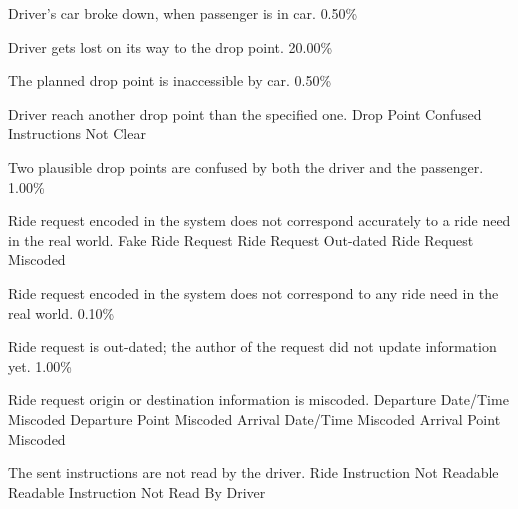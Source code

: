   \startkaosspec
  	 {Driver’s car broke down, when passenger is in car.}
  	 {0.50\%}
  \stopkaosspec
  
  \startkaosspec
  	 {Driver gets lost on its way to the drop point.}
  	 {20.00\%}
  \stopkaosspec
  
  \startkaosspec
  	 {The planned drop point is inaccessible by car.}
  	 {0.50\%}
  \stopkaosspec
  
  \startkaosspec
  	 {Driver reach another drop point than the specified one.}
  	 {Drop Point Confused}
  	 {Instructions Not Clear}
  \stopkaosspec
  
  \startkaosspec
  	 {Two plausible drop points are confused by both the driver and the passenger.}
  	 {1.00\%}
  \stopkaosspec
  

    {}

  \startkaosspec
  	 {Ride request encoded in the system does not correspond accurately to a ride need in the real world.}
  	 {Fake Ride Request}
  	 {Ride Request Out-dated}
  	 {Ride Request Miscoded}
  \stopkaosspec

  \startkaosspec
  	 {Ride request encoded in the system does not correspond to any ride need in the real world.}
  	 {0.10\%}
  \stopkaosspec

  \startkaosspec
  	 {Ride request is out-dated; the author of the request did not update information yet.}
  	 {1.00\%}
  \stopkaosspec

  \startkaosspec
  	 {Ride request origin or destination information is miscoded.}
  	 {Departure Date/Time Miscoded}
  	 {Departure Point Miscoded}
  	 {Arrival Date/Time Miscoded}
  	 {Arrival Point Miscoded}
  \stopkaosspec

  \startkaosspec
  	 {The sent instructions are not read by the driver.}
  	 {Ride Instruction Not Readable}
  	 {Readable Instruction Not Read By Driver}
  \stopkaosspec

\stopsubsection
